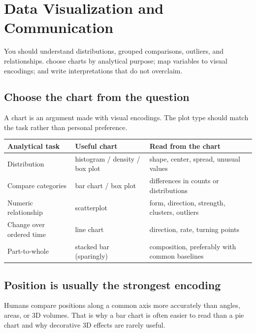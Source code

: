 \chapter{Data Visualization and Communication}
\label{chap:visualization}
\chapterguide
  {You should understand distributions, grouped comparisons, outliers, and relationships.}
  {choose charts by analytical purpose; map variables to visual encodings; and write interpretations that do not overclaim.}

\section{Choose the chart from the question}
A chart is an argument made with visual encodings. The plot type should match the task rather than personal preference.

\begin{dstable}
\begin{tabularx}{\linewidth}{@{}D{4.0cm}D{4.1cm}Y@{}}
\toprule
{}
\textbf{Analytical task} & \textbf{Useful chart} & \textbf{Read from the chart} \\
\midrule
Distribution & histogram / density / box plot & shape, center, spread, unusual values \\
Compare categories & bar chart / box plot & differences in counts or distributions \\
Numeric relationship & scatterplot & form, direction, strength, clusters, outliers \\
Change over ordered time & line chart & direction, rate, turning points \\
Part-to-whole & stacked bar (sparingly) & composition, preferably with common baselines \\
\bottomrule
\end{tabularx}
\end{dstable}

\section{Position is usually the strongest encoding}
Humans compare positions along a common axis more accurately than angles, areas, or 3D volumes. That is why a bar chart is often easier to read than a pie chart and why decorative 3D effects are rarely useful.

